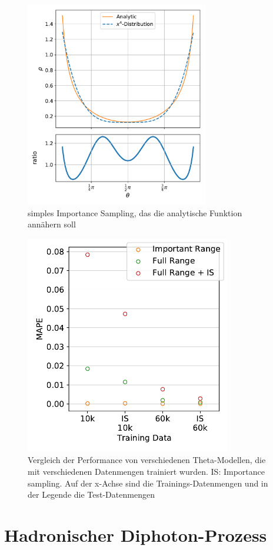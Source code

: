 \begin{figure}
	\centering
	\includegraphics[width=8cm]{graphics/4}
	\caption{simples Importance Sampling, das die analytische Funktion annähern soll}
\end{figure}
\begin{figure}
	\centering
	\includegraphics[width=9cm]{graphics/26}
	\caption{Vergleich der Performance von verschiedenen Theta-Modellen, die mit verschiedenen Datenmengen trainiert wurden. IS: Importance sampling. Auf der x-Achse sind die Trainings-Datenmengen und in der Legende die Test-Datenmengen}
\end{figure}
\section{Hadronischer Diphoton-Prozess}
